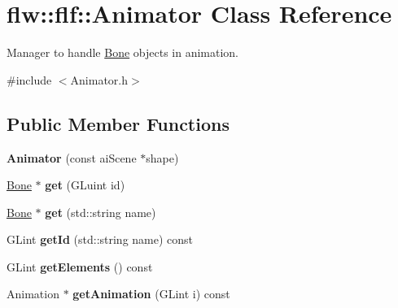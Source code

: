 \hypertarget{classflw_1_1flf_1_1Animator}{}\section{flw\+:\+:flf\+:\+:Animator Class Reference}
\label{classflw_1_1flf_1_1Animator}


Manager to handle \hyperlink{classflw_1_1flf_1_1Bone}{Bone} objects in animation.  




{\ttfamily \#include $<$Animator.\+h$>$}

\subsection*{Public Member Functions}
\begin{DoxyCompactItemize}
\item 
\mbox{\label{classflw_1_1flf_1_1Animator_af0f2073ef0f4779905aba32657734361}} 
{\bfseries Animator} (const ai\+Scene $\ast$shape)
\item 
\mbox{\label{classflw_1_1flf_1_1Animator_ac76ca1f407b797dfe12d0a23924c8abb}} 
\hyperlink{classflw_1_1flf_1_1Bone}{Bone} $\ast$ {\bfseries get} (G\+Luint id)
\item 
\mbox{\label{classflw_1_1flf_1_1Animator_a8cde1066efdc90569ba92507277ec14c}} 
\hyperlink{classflw_1_1flf_1_1Bone}{Bone} $\ast$ {\bfseries get} (std\+::string name)
\item 
\mbox{\label{classflw_1_1flf_1_1Animator_a367868191d317079cf8d57087311f0c0}} 
G\+Lint {\bfseries get\+Id} (std\+::string name) const
\item 
\mbox{\label{classflw_1_1flf_1_1Animator_a8ab4dc88b61a8003ae31db9610fd4ec4}} 
G\+Lint {\bfseries get\+Elements} () const
\item 
\mbox{\label{classflw_1_1flf_1_1Animator_a548f29f2f2c6413362b6e02cb678c1e9}} 
Animation $\ast$ {\bfseries get\+Animation} (G\+Lint i) const
\item 
\mbox{\label{classflw_1_1flf_1_1Animator_a66ce2f85566a4a1ae0edd2e7a99b73ba}} 

\end{DoxyCompactItemize}
